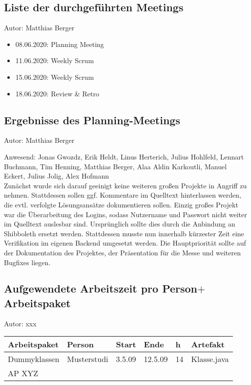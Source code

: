 \subsection{Liste der durchgeführten Meetings}
{\small Autor: Matthias Berger}
\begin{itemize}
  \item 08.06.2020: Planning Meeting
  \item 11.06.2020: Weekly Scrum
  \item 15.06.2020: Weekly Scrum
  \item 18.06.2020: Review \& Retro
\end{itemize}


\subsection{Ergebnisse des Planning-Meetings}
{\small Autor: Matthias Berger}

Anwesend: Jonas Gwozdz, Erik Heldt, Linus Herterich, Julius Hohlfeld, Lennart Buchmann, Tim Henning, Matthias Berger, Alaa Aldin Karkoutli, Manuel Eckert, Julius Jolig, Alex Hofmann\\

Zunächst wurde sich darauf geeinigt keine weiteren großen Projekte in Angriff zu nehmen. Stattdessen sollen ggf. Kommentare im Quelltext hinterlassen werden, die evtl. verfolgte Lösungsansätze dokumentieren sollen. Einzig großes Projekt war die Überarbeitung des Logins, sodass Nutzername und Passwort nicht weiter im Quelltext auslesbar sind. Ursprünglich sollte dies durch die Anbindung an Shibboleth ersetzt werden. Stattdessen musste nun innerhalb kürzester Zeit eine Verifikation im eigenen Backend umgesetzt werden. Die Hauptpriorität sollte auf der Dokumentation des Projektes, der Präsentation für die Messe und weiteren Bugfixes liegen.

\subsection{Aufgewendete Arbeitszeit pro Person$+$Arbeitspaket}
{\small Autor: xxx}

\begin{longtable}{|p{4cm}|l|l|l|l|l|}
        \hline
        Arbeitspaket & Person & Start & Ende & h & Artefakt\\
        \hline
        Dummyklassen & Musterstudi & 3.5.09 & 12.5.09 & 14 & Klasse.java\\ \hline
        AP XYZ &  &  &  & & \\ \hline
      \end{longtable}

